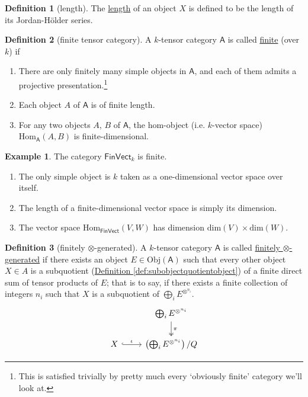 \documentclass[a4paper]{report}
\newcommand{\defn}[1]{\ul{#1}}
\newcommand{\Obj}{\mathrm{Obj}}
\newcommand{\Hom}{\mathrm{Hom}}
\theoremstyle{definition}
\newtheorem{definition}{Definition}[section]
\newtheorem{example}{Example}[section]
\theoremstyle{plain}
\theoremstyle{remark}
\begin{document}
\begin{definition}[length]
  \label{def:length}
  The \defn{length} of an object $X$ is defined to be the length of its Jordan-H{\"o}lder series.
\end{definition}

\begin{definition}[finite tensor category]
  \label{def:finitetensorcategory}
  A $k$-tensor category $\mathsf{A}$ is called \defn{finite} (over $k$) if 
  \begin{enumerate}
    \item There are only finitely many simple objects in $\mathsf{A}$, and each of them admits a projective presentation.\footnote{This is satisfied trivially by pretty much every `obviously finite' category we'll look at.}

    \item Each object $A$ of $\mathsf{A}$ is of finite length.

    \item For any two objects $A$, $B$ of $\mathsf{A}$, the hom-object (i.e. $k$-vector space) $\Hom_{\mathsf{A}}(A, B)$ is finite-dimensional.
  \end{enumerate}
\end{definition}

\begin{example}
  The category $\mathsf{FinVect}_{k}$ is finite. 
  \begin{enumerate}
    \item The only simple object is $k$ taken as a one-dimensional vector space over itself.

    \item The length of a finite-dimensional vector space is simply its dimension.

    \item The vector space $\Hom_{\mathsf{FinVect}}(V, W)$ has dimension $\mathrm{dim}(V) \times\mathrm{dim}(W)$.
  \end{enumerate}
\end{example}

\begin{definition}[finitely $\otimes$-generated]
  \label{def:finitelygenerated}
  A $k$-tensor category $\mathsf{A}$ is called \defn{finitely $\otimes$-generated} if there exists an object $E \in \Obj(\mathsf{A})$ such that every other object $X \in A$ is a subquotient (\hyperref[def:subobjectquotientobject]{Definition \ref*{def:subobjectquotientobject}}) of a finite direct sum of tensor products of $E$; that is to say, if there exists a finite collection of integers $n_{i}$ such that $X$ is a subquotient of $\bigoplus_{i} E^{\otimes^{n_{i}}}$.
  \begin{equation*}
    \begin{tikzcd}
      & \bigoplus_{i} E^{\otimes^{n_{i}}}
      \arrow[d, twoheadrightarrow, "\pi"]
      \\
      X
      \arrow[r, hookrightarrow, "\iota"]
      & \left( \bigoplus_{i} E^{\otimes^{n_{i}}} \right) / Q
    \end{tikzcd}
  \end{equation*}
\end{definition}
\end{document}
